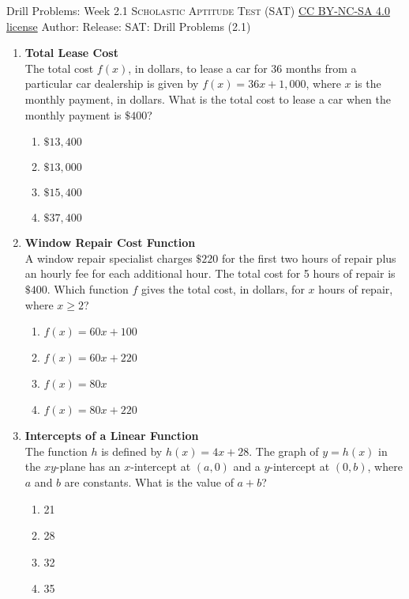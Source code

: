 \newpage\handout
{Drill Problems: Week 2.1}
{\textsc{Scholastic Aptitude Test (SAT)}}
{\href{https://creativecommons.org/licenses/by-nc-sa/4.0/}{CC BY-NC-SA 4.0 license}}
{Author: \BookAuthor}{Release: \generatedOn}
{SAT: Drill Problems (2.1)}











\begin{enumerate}

\item \textbf{Total Lease Cost}\\
The total cost $f(x)$, in dollars, to lease a car for 36 months from a particular car dealership is given by $f(x) = 36x + 1,000$, where $x$ is the monthly payment, in dollars. What is the total cost to lease a car when the monthly payment is $\$400$?
\begin{enumerate}[label=(\Alph*)]
  \item $\$13,400$
  \item $\$13,000$
  \item $\$15,400$
  \item $\$37,400$
\end{enumerate}
\begin{subanswer}
\end{subanswer}


\item \textbf{Window Repair Cost Function}\\
A window repair specialist charges $\$220$ for the first two hours of repair plus an hourly fee for each additional hour. The total cost for 5 hours of repair is $\$400$. Which function $f$ gives the total cost, in dollars, for $x$ hours of repair, where $x \geq 2$?
\begin{enumerate}[label=(\Alph*)]
  \item $f(x) = 60x + 100$
  \item $f(x) = 60x + 220$
  \item $f(x) = 80x$
  \item $f(x) = 80x + 220$
\end{enumerate}
\begin{subanswer}
\end{subanswer}

\item \textbf{Intercepts of a Linear Function}\\
The function $h$ is defined by $h(x) = 4x + 28$. The graph of $y = h(x)$ in the $xy$-plane has an $x$-intercept at $(a, 0)$ and a $y$-intercept at $(0, b)$, where $a$ and $b$ are constants. What is the value of $a + b$?
\begin{enumerate}[label=(\Alph*)]
  \item 21
  \item 28
  \item 32
  \item 35
\end{enumerate}
\begin{subanswer}
\end{subanswer}


\end{enumerate}

